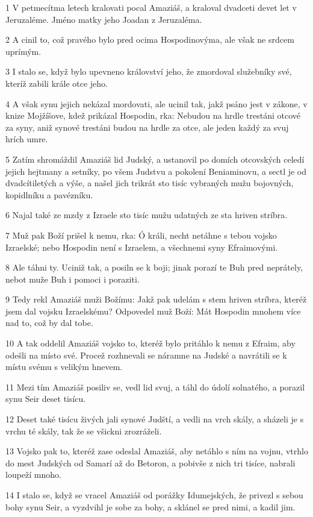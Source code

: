 \par 1 V petmecítma letech kralovati pocal Amaziáš, a kraloval dvadceti devet let v Jeruzaléme. Jméno matky jeho Joadan z Jeruzaléma.
\par 2 A cinil to, což pravého bylo pred ocima Hospodinovýma, ale však ne srdcem uprímým.
\par 3 I stalo se, když bylo upevneno království jeho, že zmordoval služebníky své, kteríž zabili krále otce jeho.
\par 4 A však synu jejich nekázal mordovati, ale ucinil tak, jakž psáno jest v zákone, v knize Mojžíšove, kdež prikázal Hospodin, rka: Nebudou na hrdle trestáni otcové za syny, aniž synové trestáni budou na hrdle za otce, ale jeden každý za svuj hrích umre.
\par 5 Zatím shromáždil Amaziáš lid Judský, a ustanovil po domích otcovských celedí jejich hejtmany a setníky, po všem Judstvu a pokolení Beniaminovu, a sectl je od dvadcítiletých a výše, a našel jich trikrát sto tisíc vybraných mužu bojovných, kopidlníku a pavézníku.
\par 6 Najal také ze mzdy z Izraele sto tisíc mužu udatných ze sta hriven stríbra.
\par 7 Muž pak Boží prišel k nemu, rka: Ó králi, necht netáhne s tebou vojsko Izraelské; nebo Hospodin není s Izraelem, a všechnemi syny Efraimovými.
\par 8 Ale táhni ty. Uciniž tak, a posiln se k boji; jinak porazí te Buh pred neprátely, nebot muže Buh i pomoci i poraziti.
\par 9 Tedy rekl Amaziáš muži Božímu: Jakž pak udelám s stem hriven stríbra, kteréž jsem dal vojsku Izraelskému? Odpovedel muž Boží: Mát Hospodin mnohem více nad to, což by dal tobe.
\par 10 A tak oddelil Amaziáš vojsko to, kteréž bylo pritáhlo k nemu z Efraim, aby odešli na místo své. Procež rozhnevali se náramne na Judské a navrátili se k místu svému s velikým hnevem.
\par 11 Mezi tím Amaziáš posiliv se, vedl lid svuj, a táhl do údolí solnatého, a porazil synu Seir deset tisícu.
\par 12 Deset také tisícu živých jali synové Judští, a vedli na vrch skály, a sházeli je s vrchu té skály, tak že se všickni zrozráželi.
\par 13 Vojsko pak to, kteréž zase odeslal Amaziáš, aby netáhlo s ním na vojnu, vtrhlo do mest Judských od Samarí až do Betoron, a pobivše z nich tri tisíce, nabrali loupeží mnoho.
\par 14 I stalo se, když se vracel Amaziáš od porážky Idumejských, že privezl s sebou bohy synu Seir, a vyzdvihl je sobe za bohy, a sklánel se pred nimi, a kadil jim.
